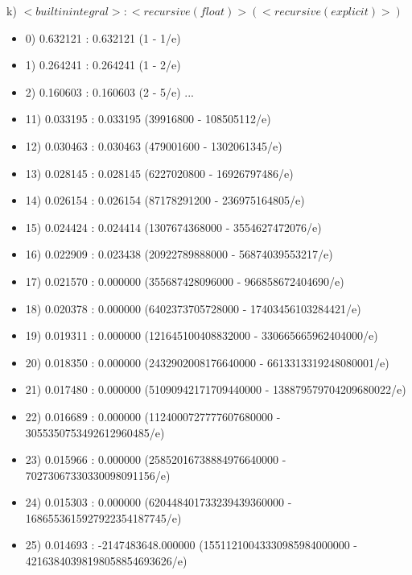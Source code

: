 \documentclass{article}
\begin{document}
	k)  $<built in integral> : <recursive(float)> (<recursive(explicit)>)$
	\begin{itemize}
		\setlength\itemsep{-5pt}
		
		\item {\small 0)  0.632121 : 0.632121 (1 - 1/e)}
		\item {\small 1)  0.264241 : 0.264241 (1 - 2/e)}
		\item {\small 2)  0.160603 : 0.160603 (2 - 5/e)}
		\newline...
		\item {\small 11)  0.033195 : 0.033195 (39916800 - 108505112/e)}
		\item {\small 12)  0.030463 : 0.030463 (479001600 - 1302061345/e)}
		\item {\small 13)  0.028145 : 0.028145 (6227020800 - 16926797486/e)}
		\item {\small 14)  0.026154 : 0.026154 (87178291200 - 236975164805/e)}
		\item {\small 15)  0.024424 : 0.024414 (1307674368000 - 3554627472076/e)}
		\item {\small 16)  0.022909 : 0.023438 (20922789888000 - 56874039553217/e)}
		\item {\small 17)  0.021570 : 0.000000 (355687428096000 - 966858672404690/e)}
		\item {\small 18)  0.020378 : 0.000000 (6402373705728000 - 17403456103284421/e)}
		\item {\small 19)  0.019311 : 0.000000 (121645100408832000 - 330665665962404000/e)}
		\item {\small 20)  0.018350 : 0.000000 (2432902008176640000 - 6613313319248080001/e)}

		\item {\small 21)  0.017480 : 0.000000 (51090942171709440000 - 138879579704209680022/e)}
		
		\item {\small 22)  0.016689 : 0.000000 (1124000727777607680000 - 3055350753492612960485/e)}
		
		\item {\small 23)  0.015966 : 0.000000 (25852016738884976640000 - 70273067330330098091156/e)}
		
		\item {\small 24)  0.015303 : 0.000000 (620448401733239439360000 - 1686553615927922354187745/e)}
		
		\item {\small 25)  0.014693 : -2147483648.000000 (15511210043330985984000000 - 42163840398198058854693626/e)}
	\end{itemize}
\end{document}
